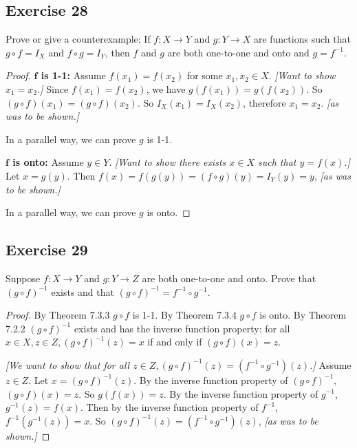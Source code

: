 \documentclass[14pt]{extarticle}
\begin{document}
\subsection{Exercise 28}
Prove or give a counterexample: If \(f: X \to Y\) and \(g: Y \to X\) are functions such that \(g \circ f = I_X\) and 
\(f \circ g = I_Y\), then $f$ and $g$ are both one-to-one and onto and \(g = f^{-1}\).

\begin{proof}
{\bf $\bm{f}$ is 1-1:} Assume \(f(x_1) = f(x_2)\) for some \(x_1, x_2 \in X\). {\it [Want to show \(x_1 = x_2\).]}
Since \(f(x_1) = f(x_2)\), we have \(g(f(x_1))=g(f(x_2))\). So \((g \circ f)(x_1) = (g \circ f)(x_2)\). 
So \(I_X(x_1) = I_X(x_2)\), therefore \(x_1 = x_2\). {\it [as was to be shown.]}

In a parallel way, we can prove $g$ is 1-1.

{\bf $\bm{f}$ is onto:} Assume \(y \in Y\). {\it [Want to show there exists \(x \in X\) such that \(y = f(x)\).]}
Let \(x = g(y)\). Then \(f(x) = f(g(y)) = (f \circ g)(y) = I_Y(y) = y\), {\it [as was to be shown.]}

In a parallel way, we can prove $g$ is onto.
\end{proof}

\subsection{Exercise 29}
Suppose \(f: X \to Y\) and \(g: Y \to Z\) are both one-to-one and onto. Prove that \((g \circ f)^{-1}\) exists and 
that \((g \circ f)^{-1} = f^{-1} \circ g^{-1}\).

\begin{proof}
By Theorem 7.3.3 \(g \circ f\) is 1-1. By Theorem 7.3.4 \(g \circ f\) is onto. By Theorem 7.2.2 \((g \circ f)^{-1}\) 
exists and has the inverse function property: for all \(x \in X, z \in Z, (g \circ f)^{-1}(z) = x\) if and only if 
\((g \circ f)(x) = z\).

{\it [We want to show that for all \(z \in Z, (g \circ f)^{-1}(z) = (f^{-1} \circ g^{-1})(z)\).]} Assume $z\in Z$.
Let \(x = (g \circ f)^{-1}(z)\). By the inverse function property of \((g \circ f)^{-1}\), \((g \circ f)(x) = z\). 
So \(g(f(x)) = z\). By the inverse function property of $g^{-1}$, \(g^{-1}(z) = f(x)\). Then by the inverse 
function property of $f^{-1}$, \(f^{-1}(g^{-1}(z)) = x\).
So \((g \circ f)^{-1}(z) = (f^{-1} \circ g^{-1})(z)\), {\it [as was to be shown.]}
\end{proof}
\end{document}
